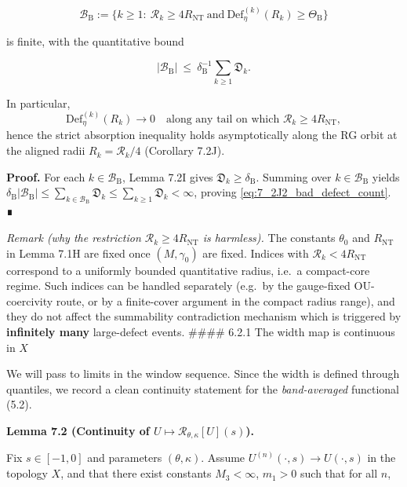 \documentclass[
  11pt,
]{article}
\begin{document}
\begin{equation}
\mathcal B_{\mathrm{B}}
:=\Big\{k\ge1:\ \mathcal R_k\ge 4R_{\mathrm{NT}}\ \text{and}\ \mathrm{Def}^{(k)}_{\eta}(R_k)\ge \Theta_{\mathrm{B}}\Big\}
\tag{7.2J1}\label{eq:7_2J1_bad_defect_set}
\end{equation}

is finite, with the quantitative bound

\begin{equation}
|\mathcal B_{\mathrm{B}}|
\ \le\ \delta_{\mathrm{B}}^{-1}\sum_{k\ge1}\mathfrak D_k.
\tag{7.2J2}\label{eq:7_2J2_bad_defect_count}
\end{equation}

In particular, \[
\mathrm{Def}^{(k)}_{\eta}(R_k)\to 0\quad\text{along any tail on which }\mathcal R_k\ge 4R_{\mathrm{NT}},
\] hence the strict absorption inequality holds asymptotically along the RG orbit at the aligned radii \(R_k=\mathcal R_k/4\) (Corollary 7.2J).

\textbf{Proof.} For each \(k\in\mathcal B_{\mathrm{B}}\), Lemma 7.2I gives \(\mathfrak D_k\ge\delta_{\mathrm{B}}\). Summing over \(k\in\mathcal B_{\mathrm{B}}\) yields \(\delta_{\mathrm{B}}|\mathcal B_{\mathrm{B}}|\le\sum_{k\in\mathcal B_{\mathrm{B}}}\mathfrak D_k\le\sum_{k\ge1}\mathfrak D_k<\infty\), proving \eqref{eq:7_2J2_bad_defect_count}. ∎

\emph{Remark (why the restriction \(\mathcal R_k\ge 4R_{\mathrm{NT}}\) is harmless).} The constants \(\theta_0\) and \(R_{\mathrm{NT}}\) in Lemma 7.1H are fixed once \((M,\gamma_0)\) are fixed. Indices with \(\mathcal R_k<4R_{\mathrm{NT}}\) correspond to a uniformly bounded quantitative radius, i.e.~a compact-core regime. Such indices can be handled separately (e.g.~by the gauge-fixed OU-coercivity route, or by a finite-cover argument in the compact radius range), and they do not affect the summability contradiction mechanism which is triggered by \textbf{infinitely many} large-defect events. \#\#\#\# 6.2.1 The width map is continuous in \(X\)

We will pass to limits in the window sequence. Since the width is defined through quantiles, we record a clean continuity statement for the \emph{band-averaged} functional (5.2).

\textbf{Lemma 7.2 (Continuity of \(U\mapsto \mathcal R_{\theta,\kappa}[U](s)\)).}

Fix \(s\in[-1,0]\) and parameters \((\theta,\kappa)\). Assume \(U^{(n)}(\cdot,s)\to U(\cdot,s)\) in the topology \(X\), and that there exist constants \(M_3<\infty\), \(m_1>0\) such that for all \(n\),
\end{document}
